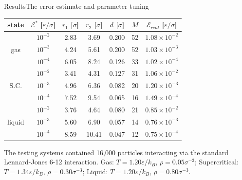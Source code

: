\documentclass{beamer}
\begin{document}
\begin{frame}[label=short-result-1]{Results}{The error estimate and parameter tuning}
  \begin{table}[t]
  \centering
  \begin{tabular*}{0.95\textwidth}{@{\extracolsep{\fill}}cc|ccccc}
    state &
    $\mathcal E^\ast$ [$\varepsilon/\sigma$]&
    $r_1$ [$\sigma$]&
    $r_2$ [$\sigma$]&
    $d$  [$\sigma$]&
    $M$ &    
    $\mathcal E_{real}$ [$\varepsilon/\sigma$] \\\hline
         &$10^{-2}$ & 2.83 & 3.69 & 0.200 & 52 & $1.08\times 10^{-2}$   \\
    gas  &$10^{-3}$ & 4.24 & 5.61 & 0.200 & 52 & $1.03\times 10^{-3}$   \\
         &$10^{-4}$ & 6.05 & 8.24 & 0.126 & 33 & $1.02\times 10^{-4}$   \\
    \hline
         &$10^{-2}$ & 3.41 & 4.31 & 0.127 & 31 & $1.06\times 10^{-2}$    \\
    S.C. &$10^{-3}$ & 4.96 & 6.36 & 0.082 & 20 & $1.20\times 10^{-3}$    \\
         &$10^{-4}$ & 7.52 & 9.54 & 0.065 & 16 & $1.49\times 10^{-4}$    \\
    \hline
           &$10^{-2}$ & 3.76 & 4.64 & 0.080 & 21 & $0.85\times 10^{-2}$    \\
    liquid &$10^{-3}$ & 5.60 & 6.90 & 0.057 & 14 & $0.76\times 10^{-3}$    \\
           &$10^{-4}$ & 8.59 &10.41 & 0.047 & 12 & $0.75\times 10^{-4}$    \\
  \end{tabular*}
 \end{table}
 The testing systems contained 16,000 particles interacting via the
 standard Lennard-Jones 6-12 interaction.
 Gas: $T=1.20\varepsilon/k_B$, $\rho=0.05\sigma^{-3}$;
 Supercritical: $T=1.34\varepsilon/k_B$, $\rho=0.30\sigma^{-3}$;
 Liquid: $T=1.20\varepsilon/k_B$, $\rho=0.80\sigma^{-3}$.
 \hfill\hyperlink{short-assumptions}{}
\end{frame}
\end{document}
